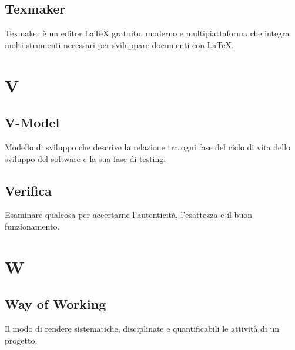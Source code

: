 	\subsection{Texmaker} 
	Texmaker è un editor LaTeX gratuito, moderno e multipiattaforma che integra molti strumenti necessari per sviluppare documenti con LaTeX. 
	
	\section{V}
	\subsection{V-Model} 
	Modello di sviluppo che descrive la relazione tra ogni fase del ciclo di vita dello sviluppo del software e la sua fase di testing.
	
	\subsection{Verifica}
	Esaminare qualcosa per accertarne l'autenticità, l'esattezza e il buon funzionamento.
	
	\section{W}
	\subsection{Way of Working} 
	Il modo di rendere sistematiche, disciplinate e quantificabili le attività di un progetto.


